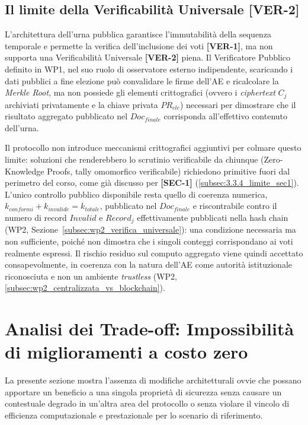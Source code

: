 \subsection{Il limite della Verificabilità Universale [VER-2]}
\label{subsec:3.3.7_limite_ver2}

L'architettura dell'urna pubblica garantisce l'immutabilità della sequenza temporale e permette la verifica dell'inclusione dei voti \textbf{[VER-1]}, ma non supporta una Verificabilità Universale \textbf{[VER-2]} piena. Il Verificatore Pubblico definito in WP1, nel suo ruolo di osservatore esterno indipendente, scaricando i dati pubblici a fine elezione può convalidare le firme dell'AE e ricalcolare la \textit{Merkle Root}, ma non possiede gli elementi crittografici (ovvero i \textit{ciphertext} $C_j$ archiviati privatamente e la chiave privata $PR_{ele}$) necessari per dimostrare che il risultato aggregato pubblicato nel $Doc_{finale}$ corrisponda all'effettivo contenuto dell'urna.

Il protocollo non introduce meccanismi crittografici aggiuntivi per colmare questo limite: soluzioni che renderebbero lo scrutinio verificabile da chiunque (Zero-Knowledge Proofs, tally omomorfico verificabile) richiedono primitive fuori dal perimetro del corso, come già discusso per \textbf{[SEC-1]} (\ref{subsec:3.3.4_limite_sec1}). L'unico controllo pubblico disponibile resta quello di coerenza numerica, $k_{conformi}+k_{invalide}=k_{totale}$, pubblicato nel $Doc_{finale}$ e riscontrabile contro il numero di record $Invalid$ e $Record_j$ effettivamente pubblicati nella hash chain (WP2, Sezione~\ref{subsec:wp2_verifica_universale}): una condizione necessaria ma non sufficiente, poiché non dimostra che i singoli conteggi corrispondano ai voti realmente espressi. Il rischio residuo sul computo aggregato viene quindi accettato consapevolmente, in coerenza con la natura dell'AE come autorità istituzionale riconosciuta e non un ambiente \textit{trustless} (WP2, \ref{subsec:wp2_centralizzata_vs_blockchain}).


\section{Analisi dei Trade-off: Impossibilità di miglioramenti a costo zero}
\label{sec:3.4_analisi_tradeoff}

La presente sezione mostra l'assenza di modifiche architetturali ovvie che possano apportare un beneficio a una singola proprietà di sicurezza senza causare un contestuale degrado in un'altra area del protocollo o senza violare il vincolo di efficienza computazionale e prestazionale per lo scenario di riferimento.

